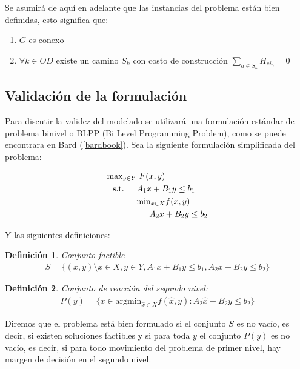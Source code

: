 \documentclass{article}
\newtheorem{definition}{Definición}
\newcommand{\modelspace}{\hspace{1.5em}}
\begin{document}
  Se asumirá de aquí en adelante que las instancias del problema están bien definidas, esto significa que:

  \begin{enumerate}
    \item {$G$ es conexo}
    \item {$\forall k \in OD$ existe un camino $S_k$ con costo de construcción $\sum_{a \in S_k} H_{ei_0} = 0$}
  \end{enumerate}

  \subsection*{Validación de la formulación}

  Para discutir la validez del modelado se utilizará una formulación estándar de problema binivel o BLPP (Bi Level Programming Problem), como se puede encontrara en Bard (\ref{bardbook}).
  Sea la siguiente formulación simplificada del problema:

  \begin{align}
    \text{max}_{y \in Y}    & \; F(x, y) \\
    \text{s.t.} \modelspace & A_1 x + B_1 y \leq b_1 \\
                            & \text{min}_{x \in X} f(x, y) \\
                            & \modelspace A_2 x + B_2 y \leq b_2
  \end{align}

  Y las siguientes definiciones:

  \begin{definition}
    Conjunto factible
    \begin{align}
      S = \{(x, y) \setminus x \in X, y \in Y, A_1 x + B_1 y \leq b_1, A_2 x + B_2 y \leq b_2 \}
    \end{align}
  \end{definition}

  \begin{definition}
    Conjunto de reacción del segundo nivel:
    \begin{align}
      P(y) = \{ x \in \text{argmin}_{\hat{x} \in X} f(\hat{x}, y) : A_2 \hat{x} + B_2 y \leq b_2 \}
    \end{align}
  \end{definition}

  Diremos que el problema está bien formulado si el conjunto $S$ es no vacío, es decir, si existen soluciones factibles y si para toda $y$ el conjunto $P(y)$ es no vacío, es decir, si para todo movimiento del problema de primer nivel, hay margen de decisión en el segundo nivel.
\end{document}
